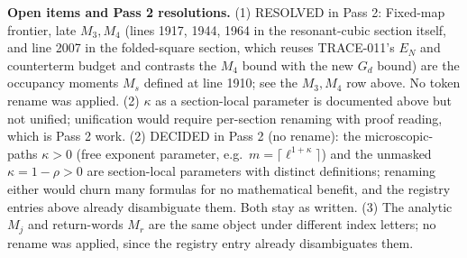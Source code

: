 \noindent\textbf{Open items and Pass 2 resolutions.}
(1) RESOLVED in Pass 2: Fixed-map frontier, late \(M_3, M_4\)
(lines 1917, 1944, 1964 in the resonant-cubic section itself, and
line 2007 in the folded-square section, which reuses TRACE-011's
\(E_N\) and counterterm budget and contrasts the \(M_4\) bound with
the new \(G_d\) bound) are the occupancy moments \(M_s\) defined at
line 1910; see the \(M_3, M_4\) row above. No token rename was
applied. (2) \(\kappa\) as a section-local parameter is
documented above but not unified; unification would require
per-section renaming with proof reading, which is Pass 2 work.
(2) DECIDED in Pass 2 (no rename): the microscopic-paths \(\kappa>0\)
(free exponent parameter, e.g.\ \(m=\lceil\ell^{1+\kappa}\rceil\)) and
the unmasked \(\kappa=1-\rho>0\) are section-local parameters with
distinct definitions; renaming either would churn many formulas for no
mathematical benefit, and the registry entries above already
disambiguate them. Both stay as written.
(3) The analytic \(M_j\) and return-words \(M_r\) are the same object
under different index letters; no rename was applied, since the
registry entry already disambiguates them.
